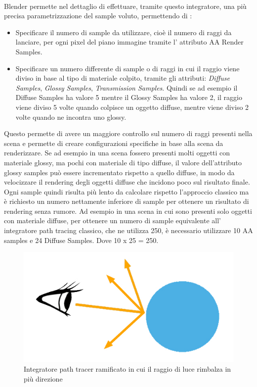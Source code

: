 \\
Blender permette nel dettaglio di effettuare, tramite questo integratore, una più precisa parametrizzazione del sample voluto, permettendo di :
\begin{itemize}
\item Specificare il numero di sample da utilizzare, cioè il numero di raggi da lanciare, per ogni pixel del piano immagine tramite l’ attributo AA Render Samples.
\item Specificare un numero differente di sample o di raggi in cui il raggio viene diviso in base al tipo di materiale colpito, tramite gli attributi: \emph{Diffuse Samples}, \emph{Glossy Samples}, \emph{Transmission Samples}. Quindi se ad esempio il Diffuse Samples ha valore 5 mentre il Glossy Samples ha valore 2, il raggio viene diviso 5 volte quando colpisce un oggetto diffuse, mentre viene diviso 2 volte quando ne incontra uno glossy.
\end{itemize}
Questo permette di avere un maggiore controllo sul numero di raggi presenti nella scena e permette di creare configurazioni specifiche in base alla scena da renderizzare.
Se ad esempio in una scena fossero presenti molti oggetti con materiale glossy, ma pochi con materiale di tipo diffuse, il valore dell’attributo glossy samples può essere incrementato rispetto a quello diffuse, in modo da velocizzare il rendering degli oggetti diffuse che incidono poco sul risultato finale.
\\
Ogni sample quindi risulta più lento da calcolare rispetto l’approccio classico ma è richiesto un numero nettamente inferiore di sample per ottenere un risultato di rendering senza rumore.
Ad esempio in una scena in cui sono presenti solo oggetti con materiale diffuse, per ottenere un numero di sample equivalente all’ integratore path tracing classico, che ne utilizza 250, è necessario utilizzare 10 AA samples e 24 Diffuse Samples. Dove 10 x 25 = 250.
\begin{figure}[htb]
 \centering
 \includegraphics[width=0.6\linewidth]{images/chapter_tecnologie_abilitanti/tecnologie_abilitanti_sferaluce2.jpg}\hfill
 \caption[Integratore path tracer ramificato]{Integratore path tracer ramificato in cui il raggio di luce rimbalza in più direzione}
 \label{fig:tecnologie_abilitanti_sferaluce2}
\end{figure}
